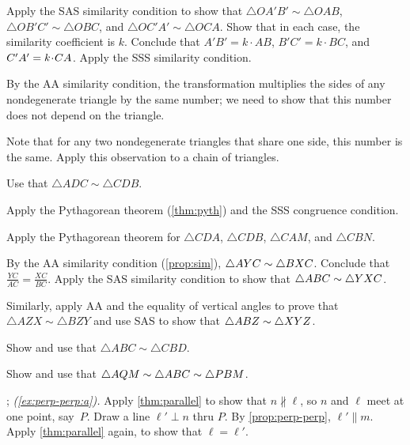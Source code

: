  Apply the SAS similarity condition to show that
$\triangle OA'B'\sim\triangle OAB$,
$\triangle OB'C'\sim\triangle OBC$,
and $\triangle OC'A'\sim\triangle OCA$.
Show that in each case, the similarity coefficient is $k$.
Conclude that $A'B'=k\cdot AB$, $B'C'=k\cdot BC$, and $C'A'\z=k\cdot CA$.
Apply the SSS similarity condition.

By the AA similarity condition, the transformation multiplies the sides of any nondegenerate triangle by the same number; we need to show that this number does not depend on the triangle. 

Note that for any two nondegenerate triangles that share one side, this number is the same.
Apply this observation to a chain of triangles.

Use that $\triangle ADC\sim \triangle CDB$.

Apply the Pythagorean theorem (\ref{thm:pyth}) and the SSS congruence condition.

 Apply the Pythagorean theorem for $\triangle CDA$, $\triangle CDB$, $\triangle CAM$, and $\triangle CBN$.

By the AA similarity condition (\ref{prop:sim}), $\triangle AYC\z\sim \triangle BXC$.
Conclude that 
$\frac{YC}{AC}=\frac{XC}{BC}$.
Apply the SAS similarity condition to show that $\triangle ABC\z\sim \triangle YXC$.

Similarly, apply AA and the equality of vertical angles to prove that $\triangle AZX\sim \triangle BZY$ and use SAS to show that $\triangle ABZ\z\sim \triangle XYZ$.

Show and use that $\triangle ABC\sim \triangle CBD$.

Show and use that $\triangle AQM\sim \triangle ABC\z\sim\triangle PBM$.


\setcounter{eqtn}{0}

\parbf{\ref{ex:perp-perp}}; \textit{(\ref{ex:perp-perp:a}).}
Apply \ref{thm:parallel} to show that $n\nparallel \ell$, so $n$ and $\ell$ meet at one point, say~$P$.
Draw a line $\ell'\perp n$ thru $P$.
By \ref{prop:perp-perp}, $\ell'\parallel m$.
Apply \ref{thm:parallel} again, to show that $\ell= \ell'$.

